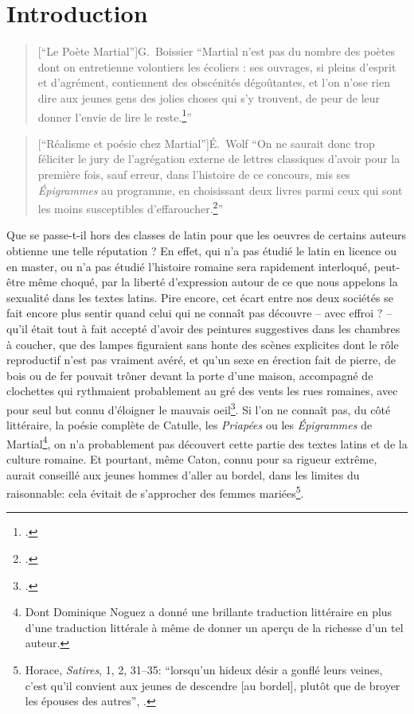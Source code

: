 \chapter*{Introduction}
\label{intro}

\begin{quote}[\enquote{Le Poète Martial}]{G.~Boissier}
    \enquote{Martial n’est pas du nombre des poètes dont on entretienne volontiers les écoliers : ses ouvrages, si pleins d’esprit et d’agrément, contiennent des obscénités dégoûtantes, et l’on n’ose rien dire aux jeunes gens des jolies choses qui s’y trouvent, de peur de leur donner l’envie de lire le reste.\footcite{boissier_poete_1900}}
\end{quote}

\begin{quote}[\enquote{Réalisme et poésie chez Martial}]{É.~Wolf}
    \enquote{On ne saurait donc trop féliciter le jury de l'agrégation externe de lettres classiques d'avoir pour la première fois, sauf erreur, dans l'histoire de ce concours, mis ses \textit{Épigrammes} au programme, en choisissant deux livres parmi ceux qui sont les moins susceptibles d'effaroucher.\footcite{wolff_realisme_1997}}
\end{quote}

Que se passe-t-il hors des classes de latin pour que les oeuvres de certains auteurs obtienne une telle réputation ? En effet, qui n'a pas étudié le latin en licence ou en master, ou n'a pas étudié l'histoire romaine sera rapidement interloqué, peut-être même choqué, par la liberté d'expression autour de ce que nous appelons la sexualité dans les textes latins. Pire encore, cet écart entre nos deux sociétés se fait encore plus sentir quand celui qui ne connaît pas découvre -- avec effroi ? -- qu'il était tout à fait accepté d'avoir des peintures suggestives dans les chambres à coucher, que des lampes figuraient sans honte des scènes explicites dont le rôle reproductif n'est pas vraiment avéré, et qu'un sexe en érection fait de pierre, de bois ou de fer pouvait trôner devant la porte d'une maison, accompagné de clochettes qui rythmaient probablement au gré des vents les rues romaines, avec pour seul but connu d'éloigner le mauvais oeil\footcite{parker_bells_2018}. Si l'on ne connaît pas, du côté littéraire, la poésie complète de Catulle, les \textit{Priapées} ou les \textit{Épigrammes} de Martial\footnote{Dont Dominique Noguez a donné une brillante traduction littéraire en plus d'une traduction littérale à même de donner un aperçu de la richesse d'un tel auteur.}, on n'a probablement pas découvert cette partie des textes latins et de la culture romaine. Et pourtant, même Caton, connu pour sa rigueur extrême, aurait conseillé aux jeunes hommes d'aller au bordel, dans les limites du raisonnable: cela évitait de s'approcher des femmes mariées\footnote{Horace, \textit{Satires}, 1, 2, 31--35: \enquote{lorsqu'un hideux désir a gonflé leurs veines, c'est qu'il convient aux jeunes de descendre [au bordel], plutôt que de broyer les épouses des autres}, \textcite[p.~30]{puccini_delbey_vie_2010}.}.

